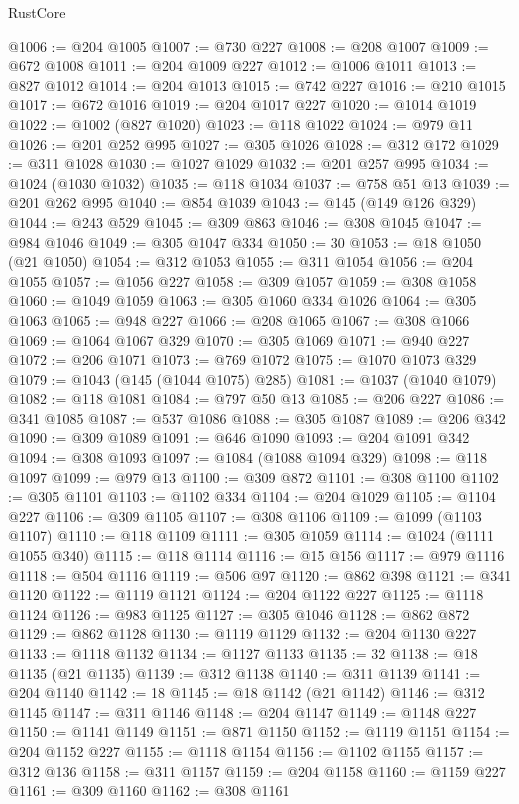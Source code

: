 \begin{lexlean}{RustCore}
\begin{coremodule}
@1006 := @204 @1005
@1007 := @730 @227
@1008 := @208 @1007
@1009 := @672 @1008
@1011 := @204 @1009 @227
@1012 := @1006 @1011
@1013 := @827 @1012
@1014 := @204 @1013
@1015 := @742 @227
@1016 := @210 @1015
@1017 := @672 @1016
@1019 := @204 @1017 @227
@1020 := @1014 @1019
@1022 := @1002 (@827 @1020)
@1023 := @118 @1022
@1024 := @979 @11
@1026 := @201 @252 @995
@1027 := @305 @1026
@1028 := @312 @172
@1029 := @311 @1028
@1030 := @1027 @1029
@1032 := @201 @257 @995
@1034 := @1024 (@1030 @1032)
@1035 := @118 @1034
@1037 := @758 @51 @13
@1039 := @201 @262 @995
@1040 := @854 @1039
@1043 := @145 (@149 @126 @329)
@1044 := @243 @529
@1045 := @309 @863
@1046 := @308 @1045
@1047 := @984 @1046
@1049 := @305 @1047 @334
@1050 := 30
@1053 := @18 @1050 (@21 @1050)
@1054 := @312 @1053
@1055 := @311 @1054
@1056 := @204 @1055
@1057 := @1056 @227
@1058 := @309 @1057
@1059 := @308 @1058
@1060 := @1049 @1059
@1063 := @305 @1060 @334 @1026
@1064 := @305 @1063
@1065 := @948 @227
@1066 := @208 @1065
@1067 := @308 @1066
@1069 := @1064 @1067 @329
@1070 := @305 @1069
@1071 := @940 @227
@1072 := @206 @1071
@1073 := @769 @1072
@1075 := @1070 @1073 @329
@1079 := @1043 (@145 (@1044 @1075) @285)
@1081 := @1037 (@1040 @1079)
@1082 := @118 @1081
@1084 := @797 @50 @13
@1085 := @206 @227
@1086 := @341 @1085
@1087 := @537 @1086
@1088 := @305 @1087
@1089 := @206 @342
@1090 := @309 @1089
@1091 := @646 @1090
@1093 := @204 @1091 @342
@1094 := @308 @1093
@1097 := @1084 (@1088 @1094 @329)
@1098 := @118 @1097
@1099 := @979 @13
@1100 := @309 @872
@1101 := @308 @1100
@1102 := @305 @1101
@1103 := @1102 @334
@1104 := @204 @1029
@1105 := @1104 @227
@1106 := @309 @1105
@1107 := @308 @1106
@1109 := @1099 (@1103 @1107)
@1110 := @118 @1109
@1111 := @305 @1059
@1114 := @1024 (@1111 @1055 @340)
@1115 := @118 @1114
@1116 := @15 @156
@1117 := @979 @1116
@1118 := @504 @1116
@1119 := @506 @97
@1120 := @862 @398
@1121 := @341 @1120
@1122 := @1119 @1121
@1124 := @204 @1122 @227
@1125 := @1118 @1124
@1126 := @983 @1125
@1127 := @305 @1046
@1128 := @862 @872
@1129 := @862 @1128
@1130 := @1119 @1129
@1132 := @204 @1130 @227
@1133 := @1118 @1132
@1134 := @1127 @1133
@1135 := 32
@1138 := @18 @1135 (@21 @1135)
@1139 := @312 @1138
@1140 := @311 @1139
@1141 := @204 @1140
@1142 := 18
@1145 := @18 @1142 (@21 @1142)
@1146 := @312 @1145
@1147 := @311 @1146
@1148 := @204 @1147
@1149 := @1148 @227
@1150 := @1141 @1149
@1151 := @871 @1150
@1152 := @1119 @1151
@1154 := @204 @1152 @227
@1155 := @1118 @1154
@1156 := @1102 @1155
@1157 := @312 @136
@1158 := @311 @1157
@1159 := @204 @1158
@1160 := @1159 @227
@1161 := @309 @1160
@1162 := @308 @1161

\end{coremodule}
\end{lexlean}
